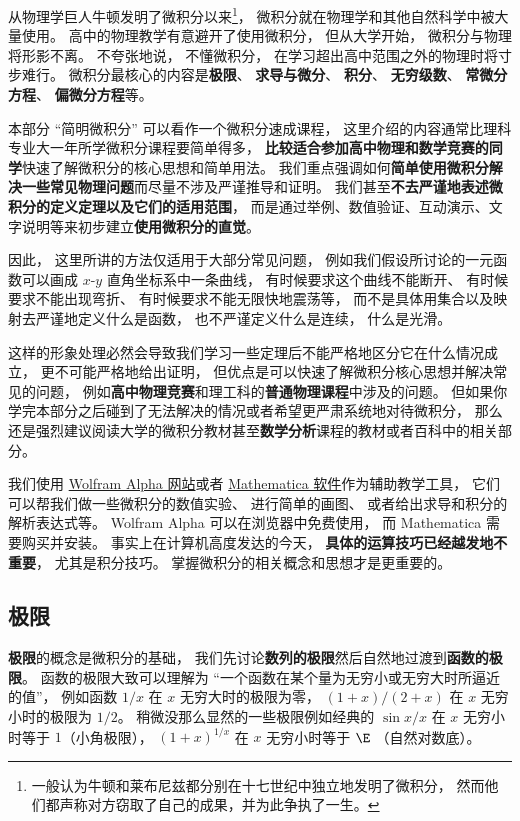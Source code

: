 
\begin{issues}
\issueDraft
\end{issues}

从物理学巨人牛顿发明了微积分以来\footnote{一般认为牛顿和莱布尼兹都分别在十七世纪中独立地发明了微积分， 然而他们都声称对方窃取了自己的成果，并为此争执了一生。}， 微积分就在物理学和其他自然科学中被大量使用。 高中的物理教学有意避开了使用微积分， 但从大学开始， 微积分与物理将形影不离。 不夸张地说， 不懂微积分， 在学习超出高中范围之外的物理时将寸步难行。 微积分最核心的内容是\textbf{极限}、 \textbf{求导与微分}、 \textbf{积分}、 \textbf{无穷级数}、 \textbf{常微分方程}、 \textbf{偏微分方程}等。

本部分 “简明微积分” 可以看作一个微积分速成课程， 这里介绍的内容通常比理科专业大一年所学微积分课程要简单得多， \textbf{比较适合参加高中物理和数学竞赛的同学}快速了解微积分的核心思想和简单用法。 我们重点强调如何\textbf{简单使用微积分解决一些常见物理问题}而尽量不涉及严谨推导和证明。 我们甚至\textbf{不去严谨地表述微积分的定义定理以及它们的适用范围}， 而是通过举例、数值验证、互动演示、文字说明等来初步建立\textbf{使用微积分的直觉}。

因此， 这里所讲的方法仅适用于大部分常见问题， 例如我们假设所讨论的一元函数可以画成 $x$-$y$ 直角坐标系中一条曲线， 有时候要求这个曲线不能断开、 有时候要求不能出现弯折、 有时候要求不能无限快地震荡等， 而不是具体用集合以及映射去严谨地定义什么是函数， 也不严谨定义什么是连续， 什么是光滑。

这样的形象处理必然会导致我们学习一些定理后不能严格地区分它在什么情况成立， 更不可能严格地给出证明， 但优点是可以快速了解微积分核心思想并解决常见的问题， 例如\textbf{高中物理竞赛}和理工科的\textbf{普通物理课程}中涉及的问题。 但如果你学完本部分之后碰到了无法解决的情况或者希望更严肃系统地对待微积分， 那么还是强烈建议阅读大学的微积分教材甚至\textbf{数学分析}课程的教材或者百科中的相关部分。

我们使用 \href{https://www.wolframalpha.com/}{Wolfram Alpha 网站}或者 \href{https://www.wolfram.com/mathematica/}{Mathematica 软件}作为辅助教学工具， 它们可以帮我们做一些微积分的数值实验、 进行简单的画图、 或者给出求导和积分的解析表达式等。 Wolfram Alpha 可以在浏览器中免费使用， 而 Mathematica 需要购买并安装。 事实上在计算机高度发达的今天， \textbf{具体的运算技巧已经越发地不重要}， 尤其是积分技巧。 掌握微积分的相关概念和思想才是更重要的。

\subsection{极限}
\textbf{极限}的概念是微积分的基础， 我们先讨论\textbf{数列的极限}然后自然地过渡到\textbf{函数的极限}。 函数的极限大致可以理解为 “一个函数在某个量为无穷小或无穷大时所逼近的值”， 例如函数 $1/x$ 在 $x$ 无穷大时的极限为零， $(1+x)/(2+x)$ 在 $x$ 无穷小时的极限为 $1/2$。 稍微没那么显然的一些极限例如经典的 $\sin x/ x$ 在 $x$ 无穷小时等于 $1$（小角极限）， $(1+x)^{1/x}$ 在 $x$ 无穷小时等于 $\E$ （自然对数底）。

